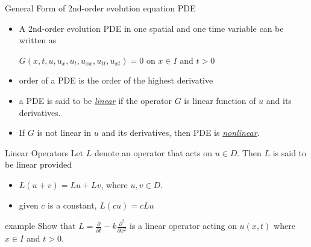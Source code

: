 \documentclass[t,10pt,fleqn]{beamer}
\def\d{\partial}
\newcommand{\tu}[1]{\underline{\textit{#1}}}
\begin{document}
\begin{frame}

\begin{block}{General Form of 2nd-order evolution equation PDE}

\begin{itemize}
    \pause
      \item  A 2nd-order evolution PDE in one spatial and one time variable can be written as 
          \pause 
      \begin{center}
            $G(x,t,u,u_x, u_t,u_{xx}, u_{tt}, u_{xt})=0$ on $x \in I$ and $t>0$
      \end{center}
  
         \pause
      \item order of a PDE is the order of the highest derivative
            \pause
      \item a PDE is said to be \tu{linear} if the operator $G$ is linear function of $u$ and its derivatives.
               \pause
      \item If $G$ is not linear in $u$ and its derivatives, then PDE is \tu{nonlinear}. 
      
       \end{itemize}
  \end{block}
  
  
  
 \end{frame}

\begin{frame}

\begin{block}{Linear Operators}
Let $L$ denote an operator that acts on $u \in D$.  Then $L$ is said to be linear provided
\begin{itemize}
    \pause
      \item  $L(u+v) = Lu + Lv$, where $u,v \in D$.
         \pause
      \item  given $c$ is a constant, $L(cu) = c Lu$
         
\end{itemize}
  \end{block}
  
           \pause
  
  \begin{block}{example}
               Show that $L = \frac{\d}{\d t} - k \frac{\d^2}{\d x^2}$ is a linear operator acting on $u(x,t)$ where $x \in I$ and $t>0$.
   \end{block}
   

   
 \end{frame}
\end{document}
